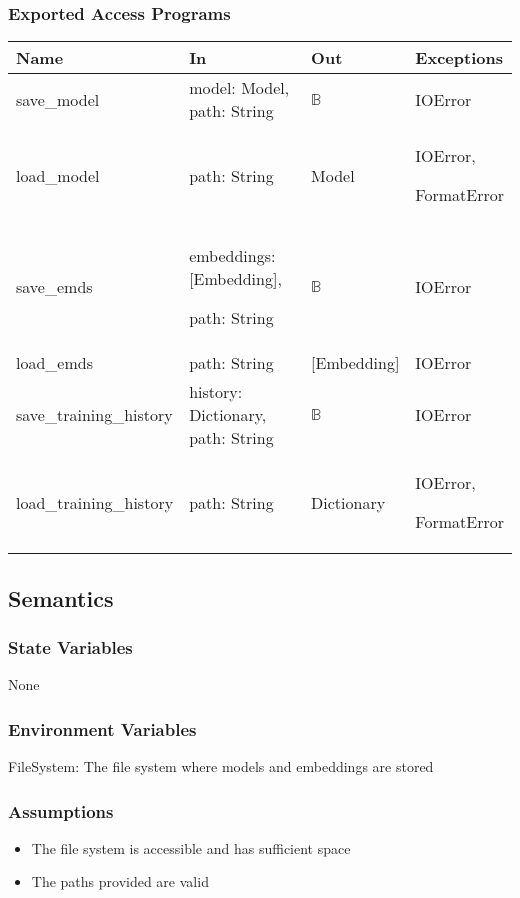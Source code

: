 \documentclass[12pt, titlepage]{article}
\begin{document}
\subsubsection{Exported Access Programs}

\begin{center}
\begin{tabular}{p{4cm} p{4cm} p{4cm} p{2cm}}
\hline
\textbf{Name} & \textbf{In} & \textbf{Out} & \textbf{Exceptions} \\
\hline
save\_model & model: Model, path: String & $\mathbb{B}$ & IOError \\
\hline
load\_model & path: String &  Model & IOError,

FormatError \\
\hline
save\_emds & embeddings: [Embedding],

path: String &  $\mathbb{B}$ & IOError \\
\hline
load\_emds & path: String &  [Embedding] & IOError \\
\hline


save\_training\_history & history: Dictionary, path: String & $\mathbb{B}$ & IOError \\
\hline
load\_training\_history & path: String & Dictionary & IOError, 

FormatError \\
\hline
\end{tabular}
\end{center}

\subsection{Semantics}

\subsubsection{State Variables}
None

\subsubsection{Environment Variables}

FileSystem: The file system where models and embeddings are stored

\subsubsection{Assumptions}

\begin{itemize}
  \item The file system is accessible and has sufficient space
  \item The paths provided are valid
\end{itemize}
\end{document}
